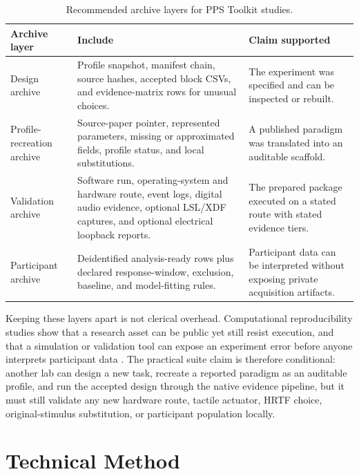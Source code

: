 \documentclass[pdflatex,sn-apa]{sn-jnl}
\begin{document}
\begin{table}[t]
\caption{Recommended archive layers for PPS Toolkit studies.}
\label{tab:archive-layers}
\footnotesize
\begin{tabularx}{\textwidth}{>{\raggedright\arraybackslash}p{} >{\raggedright\arraybackslash}X >{\raggedright\arraybackslash}p{}}
\toprule
Archive layer & Include & Claim supported \\
\midrule
Design archive & Profile snapshot, manifest chain, source hashes, accepted block CSVs, and evidence-matrix rows for unusual choices. & The experiment was specified and can be inspected or rebuilt. \\
Profile-recreation archive & Source-paper pointer, represented parameters, missing or approximated fields, profile status, and local substitutions. & A published paradigm was translated into an auditable scaffold. \\
Validation archive & Software run, operating-system and hardware route, event logs, digital audio evidence, optional LSL/XDF captures, and optional electrical loopback reports. & The prepared package executed on a stated route with stated evidence tiers. \\
Participant archive & Deidentified analysis-ready rows plus declared response-window, exclusion, baseline, and model-fitting rules. & Participant data can be interpreted without exposing private acquisition artifacts. \\
\bottomrule
\end{tabularx}
\end{table}

Keeping these layers apart is not clerical overhead. Computational reproducibility studies show that a research asset can be public yet still resist execution, and that a simulation or validation tool can expose an experiment error before anyone interprets participant data \citep{Ellis2024,DeLeeuw2022}. The practical suite claim is therefore conditional: another lab can design a new task, recreate a reported paradigm as an auditable profile, and run the accepted design through the native evidence pipeline, but it must still validate any new hardware route, tactile actuator, HRTF choice, original-stimulus substitution, or participant population locally.

\section{Technical Method}
\end{document}
